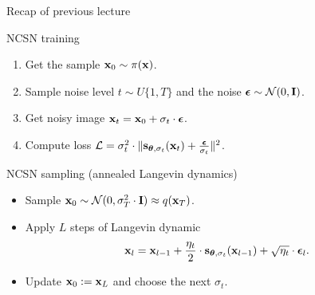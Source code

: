 \begin{frame}{Recap of previous lecture}
	\begin{block}{NCSN training}
		\begin{enumerate}
			\item Get the sample $\mathbf{x}_0 \sim \pi(\mathbf{x})$.
			\item Sample noise level $t \sim U\{1, T\}$ and the noise $\boldsymbol{\epsilon} \sim \mathcal{N}(0, \mathbf{I})$.
			\item Get noisy image $\mathbf{x}_t = \mathbf{x}_0 + \sigma_t \cdot \boldsymbol{\epsilon}$.
			\item Compute loss $ \mathcal{L} = \sigma_t^2 \cdot \| \mathbf{s}_{\boldsymbol{\theta}, \sigma_t}(\mathbf{x}_t) + \frac{\boldsymbol{\epsilon}}{\sigma_t} \|^2 $.
		\end{enumerate}
	\end{block}
	\begin{block}{NCSN sampling (annealed Langevin dynamics)}
		\begin{itemize}
			\item Sample $\mathbf{x}_0 \sim \mathcal{N}(0, \sigma_T^2 \cdot \mathbf{I}) \approx q(\mathbf{x}_T)$.
			\item Apply $L$ steps of Langevin dynamic
			\vspace{-0.2cm}
			\[
				\mathbf{x}_l = \mathbf{x}_{l-1} + \frac{\eta_t}{2} \cdot \mathbf{s}_{\boldsymbol{\theta}, \sigma_t}(\mathbf{x}_{l - 1}) + \sqrt{\eta_t} \cdot \boldsymbol{\epsilon}_l.
			\] 
			\vspace{-0.5cm}
			\item Update $\mathbf{x}_0 := \mathbf{x}_L$ and choose the next $\sigma_t$.
		\end{itemize}
	\end{block}
\end{frame}
